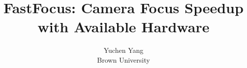 \documentclass[letterpaper,twocolumn,10pt]{article}
\newcommand{\sysname}{FastFocus\xspace}
\begin{document}

\date{}

\title{\Large \bf \sysname: Camera Focus Speedup with Available Hardware}

\author{
{\rm Yuchen Yang}\\
Brown University
}

\maketitle









\clearpage


\end{document}
